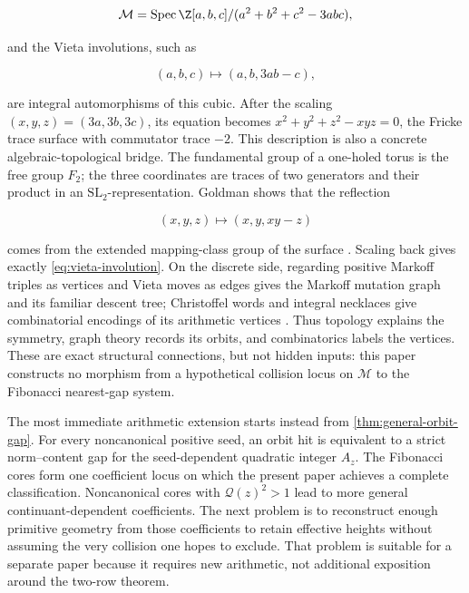 \begin{equation}
 \mathcal M
 =\operatorname{Spec}
 \Z[a,b,c]/(a^2+b^2+c^2-3abc),
 \label{eq:markoff-scheme}
\end{equation}

and the Vieta involutions, such as

\begin{equation}
 (a,b,c)\longmapsto(a,b,3ab-c),
 \label{eq:vieta-involution}
\end{equation}

are integral automorphisms of this cubic. After the scaling
$(x,y,z)=(3a,3b,3c)$, its equation becomes
$x^2+y^2+z^2-xyz=0$, the Fricke trace surface with commutator trace $-2$.
This description is also a concrete algebraic-topological bridge. The
fundamental group of a one-holed torus is the free group $F_2$; the three
coordinates are traces of two generators and their product in an
$\mathrm{SL}_2$-representation. Goldman shows that the reflection

\[
 (x,y,z)\longmapsto(x,y,xy-z)
\]

comes from the extended mapping-class group of the surface
\cite[Sections~2.1--2.2 and Appendix~A-3]{Goldman2003}. Scaling back gives
exactly \cref{eq:vieta-involution}. On the discrete side, regarding positive
Markoff triples as vertices and Vieta moves as edges gives the Markoff
mutation graph and its familiar descent tree; Christoffel words and integral
necklaces give combinatorial encodings of its arithmetic vertices
\cite{Reutenauer2026,Fisac2025}. Thus topology explains the symmetry, graph
theory records its orbits, and combinatorics labels the vertices. These are
exact structural connections, but not hidden inputs: this paper constructs
no morphism from a hypothetical collision locus on $\mathcal M$ to the
Fibonacci nearest-gap system.

The most immediate arithmetic extension starts instead from
\cref{thm:general-orbit-gap}. For every noncanonical positive seed, an orbit
hit is equivalent to a strict norm--content gap for the seed-dependent
quadratic integer $A_z$. The Fibonacci cores form one coefficient locus on
which the present paper achieves a complete classification. Noncanonical
cores with $\mathcal Q(z)^2>1$ lead to more general continuant-dependent
coefficients. The next problem is to reconstruct enough primitive geometry
from those coefficients to retain effective heights without assuming the
very collision one hopes to exclude. That problem is suitable for a separate
paper because it requires new arithmetic, not additional exposition around
the two-row theorem.

